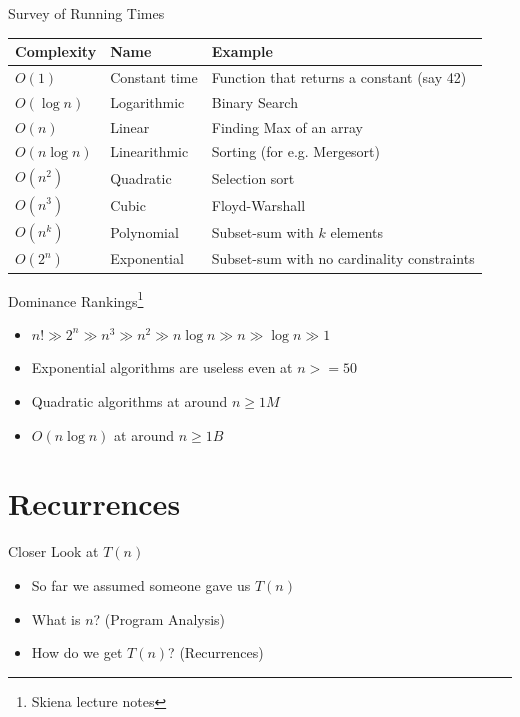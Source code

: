 \documentclass{beamer}
\begin{document}
\begin{frame}{Survey of Running Times}
\begin{center}
    \begin{table}[h]
        \begin{tabular}{|l|l|p{2in}|}
            \hline
            {\bf Complexity} & {\bf Name} & {\bf Example} \\ \hline
            $O(1)$ & Constant time & Function that returns a constant (say 42)\\ \hline
            $O(\log n)$ & Logarithmic & Binary Search \\ \hline
            $O(n)$ & Linear & Finding Max of an array\\ \hline
            $O(n \log n)$ & Linearithmic & Sorting (for e.g. Mergesort) \\ \hline
            $O(n^2)$ & Quadratic & Selection sort \\ \hline
            $O(n^3)$ & Cubic & Floyd-Warshall \\ \hline
            $O(n^k)$ & Polynomial & Subset-sum with $k$ elements\\ \hline
            $O(2^n)$ & Exponential & Subset-sum with no cardinality constraints\\ \hline
        \end{tabular}
    \end{table}
\end{center}
\end{frame}


\begin{frame}{Dominance Rankings\footnote{Skiena lecture notes}}
\begin{itemize}
\item $n! \gg 2^n \gg n^3 \gg n^2 \gg n \log n \gg n \gg \log n \gg 1$
\item Exponential algorithms are useless even at $n >= 50$
\item Quadratic algorithms at around $n \geq 1M$
\item $O(n \log n)$ at around $n \geq 1B$
\end{itemize}
\end{frame}

\section{Recurrences}
\begin{frame}{Closer Look at $T(n)$}
\begin{itemize}
\item So far we assumed someone gave us $T(n)$ 
\item What is $n$? (Program Analysis)
\item How do we get $T(n)$? (Recurrences)
\end{itemize}
\end{frame}
\end{document}
